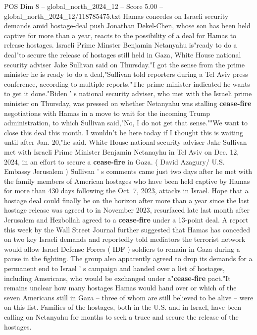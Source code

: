 \begin{textsample}{POS Dim 8 – global\_north\_2024\_12 – Score 5.00 – global\_north\_2024\_12/118785475.txt}  \label{ex:f8_pos_346}
Hamas concedes on Israeli security demands amid hostage-deal push Jonathan Dekel-Chen, whose son has been held captive for more than a year, reacts to the possibility of a deal for Hamas to release hostages.
Israeli Prime Minster Benjamin Netanyahu is"ready to do a deal"to secure the release of hostages still held in Gaza, White House national security adviser Jake Sullivan said on Thursday."I got the sense from the prime minister he is ready to do a deal,"Sullivan told reporters during a Tel Aviv press conference, according to multiple reports."The prime minister indicated he wants to get it done."Biden ' s national security adviser, who met with the Israeli prime minister on Thursday, was pressed on whether Netanyahu was stalling \textbf{cease-fire} negotiations with Hamas in a move to wait for the incoming Trump administration, to which Sullivan said,"No, I do not get that sense.""We want to close this deal this month.
I wouldn't be here today if I thought this is waiting until after Jan. 20,"he said.
White House national security adviser Jake Sullivan met with Israeli Prime Minister Benjamin Netanayhu in Tel Aviv on Dec. 12, 2024, in an effort to secure a \textbf{cease-fire} in Gaza. ( David Azagury/ U.S.
Embassy Jerusalem ) Sullivan ' s comments came just two days after he met with the family members of American hostages who have been held captive by Hamas for more than 430 days following the Oct. 7, 2023, attacks in Israel.
Hope that a hostage deal could finally be on the horizon after more than a year since the last hostage release was agreed to in November 2023, resurfaced late last month after Jerusalem and Hezbollah agreed to a \textbf{cease-fire} under a 13-point deal.
A report this week by the Wall Street Journal further suggested that Hamas has conceded on two key Israeli demands and reportedly told mediators the terrorist network would allow Israel Defense Forces ( IDF ) soldiers to remain in Gaza during a pause in the fighting.
The group also apparently agreed to drop its demands for a permanent end to Israel ' s campaign and handed over a list of hostages, including Americans, who would be exchanged under a"\textbf{cease-fire} pact."It remains unclear how many hostages Hamas would hand over or which of the seven Americans still in Gaza -- three of whom are still believed to be alive -- were on this list.
Families of the hostages, both in the U.S. and in Israel, have been calling on Netanyahu for months to seek a truce and secure the release of the hostages.

\end{textsample}
